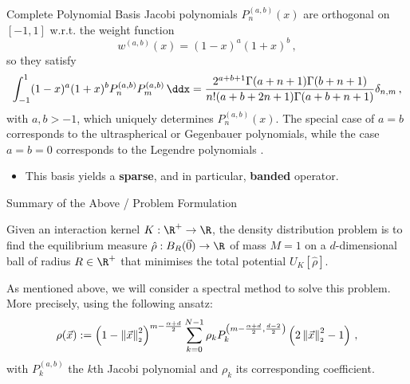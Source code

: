 \documentclass[aspectratio=169, hyperref={colorlinks=true}]{beamer}
\begin{document}
  \begin{frame}{Complete Polynomial Basis}
    Jacobi polynomials $P_n^{(a,b)}(x)$ are orthogonal on $[-1,1]$ w.r.t. the weight function
    \begin{equation*}
      w^{(a,b)}(x)=(1-x)^a (1+x)^b\,,
    \end{equation*}
    so they satisfy
    \begin{align*}\label{eq:orthogonalityconditionJacobi}
      \int_{-1}^1(1-x)^a(1+x)^bP_n^{(a,b)}P_m^{(a,b)}\,\ddx = \frac{2^{a+b+1} \Gamma (a+n+1) \Gamma (b+n+1)}{n! (a+b+2 n+1) \Gamma (a+b+n+1)} \delta_{n,m}\,,
    \end{align*}
    with $a	,b>-1$, which uniquely determines $P_n^{(a,b)}(x)$. The special case of $a=b$ corresponds to the ultraspherical or Gegenbauer polynomials, while the case $a=b=0$ corresponds to the Legendre polynomials \cite{2018-nist}.

    \begin{itemize}
      \item This basis yields a \textbf{sparse}, and in particular, \textbf{banded} operator.
    \end{itemize}
  \end{frame}

  \begin{frame}{Summary of the Above / Problem Formulation}
    \begin{definition}
      Given an interaction kernel $K: \R^+ \to \R$, the density distribution problem is to find the equilibrium measure $\hat{\rho}: B_R(\vec{0}) \to \R$ of mass $M = 1$ on a $d$-dimensional ball of radius $R \in \R^+$ that minimises the total potential $U_K[\hat{\rho}]$.
    \end{definition}
    \pause

    As mentioned above, we will consider a \alert{spectral method} to solve this problem. More precisely, using the following ansatz:
    \begin{equation}
      \rho(\vec{x}) := \left(1-\left\lVert\vec{x}\right\rVert_{\scriptscriptstyle 2}^{2}\right)^{m - \frac{\alpha + d}{2}} \sum_{k=0}^{N-1} \rho_k P_{k}^{\left(m - \frac{\alpha + d}{2},\frac{d-2}{2}\right)}\left(2 \left\lVert\vec{x}\right\rVert_{\scriptscriptstyle 2}^{2}-1\right)\,,
      \label{eq:ansatz}
    \end{equation}
    with $P_k^{(a, b)}$ the $k$th Jacobi polynomial and $\rho_k$ its corresponding coefficient.
  \end{frame}
\end{document}
